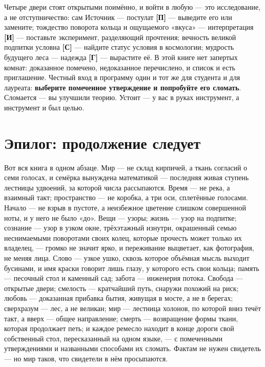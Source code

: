 \documentclass[11pt,letterpaper]{article}
\newcommand{\stC}{\textbf{[С]}\xspace}
\newcommand{\stP}{\textbf{[П]}\xspace}
\newcommand{\stI}{\textbf{[И]}\xspace}
\newcommand{\stH}{\textbf{[Г]}\xspace}
\begin{document}
Четыре двери стоят открытыми поимённо, и войти в любую --- это
исследование, а не отступничество: сам Источник --- постулат \stP{}
--- выведите его или замените; тождество поворота кольца и
ощущаемого «вкуса» --- интерпретация \stI{} --- поставьте
эксперимент, разделяющий прочтения; вечность великой подпитки
условна \stC{} --- найдите статус условия в космологии; мудрость
будущего леса --- надежда \stH{} --- вырастите её. В этой книге нет
запертых комнат: доказанное помечено, недоказанное перечислено, и
список и есть приглашение. Честный вход в программу один и тот же
для студента и для лауреата: \textbf{выберите помеченное
утверждение и попробуйте его сломать}. Сломается --- вы улучшили
теорию. Устоит --- у вас в руках инструмент, а инструмент и был
целью.

\section*{Эпилог: продолжение следует}

Вот вся книга в одном абзаце. Мир --- не склад кирпичей, а ткань
согласий о семи голосах, и семёрка вынуждена математикой ---
последняя живая ступень лестницы удвоений, за которой числа
рассыпаются. Время ---
не река, а взаимный такт; пространство --- не коробка, а три оси,
сплетённые голосами. Начало --- не взрыв в пустоте, а
неизбежное цветение слишком совершенной ноты, и у него не было
«до». Вещи --- узоры; жизнь --- узор на подпитке; сознание --- узор
в узком окне, трёхэтажный изнутри, окрашенный семью неснимаемыми
поворотами своих колец, которые прочесть может только их владелец,
--- громко не значит ярко, и переживание выцветает, как фотография,
не меняя лица. Слово --- узкое ушко, сквозь которое
объёмная мысль выходит бусинами, и имя краски говорит лишь глазу,
у которого есть свои кольца; память --- песочный стол и
каменный сад; забота --- инженерия потока. Свобода --- открытые
двери; смелость --- кратчайший путь, снаружи похожий на риск;
любовь --- доказанная прибавка бытия, живущая в мосте, а не в
берегах; сверхразум --- лес, а не великан; мир --- лестница холонов,
по которой вниз течёт такт, а вверх --- общее направление;
смерть --- возвращение формы ткани, которая продолжает петь;
и каждое ремесло находит в
конце дороги свой собственный стол, пересказанный на одном языке,
--- с помеченными утверждениями и названными способами их сломать.
Фактам
не нужен свидетель --- но мир таков, что свидетели в нём
просыпаются.
\end{document}
